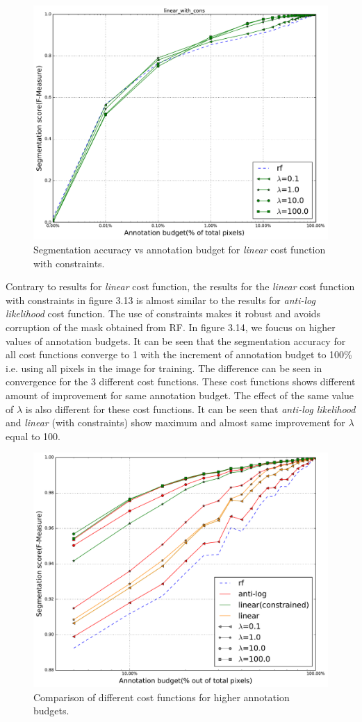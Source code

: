 \begin{figure}[h!] \label{fig:rf_vip3}
\centering
 \includegraphics[width=0.75\linewidth]{figures/linear_with_cons.pdf}
\caption{Segmentation accuracy vs annotation budget for \textit{linear} cost function with constraints.}
\end{figure}

Contrary to results for \textit{linear} cost function, the results for the \textit{linear} cost function with constraints in figure 3.13 is almost similar to the results for \textit{anti-log likelihood} cost function. The use of constraints makes it robust and avoids corruption of the mask obtained from RF. In figure 3.14, we foucus on higher values of annotation budgets. It can be seen that the segmentation accuracy for all cost functions converge to 1 with the increment of annotation budget to 100\% i.e. using all pixels in the image for training. The difference can be seen in convergence for the 3 different cost functions. These cost functions shows different amount of improvement for same annotation budget. The effect of the same value of $\lambda$ is also different for these cost functions. It can be seen that \textit{anti-log likelihood} and \textit{linear} (with constraints) show maximum and almost same improvement for $\lambda$ equal to 100.



\begin{figure}[h!] \label{fig:rf_vip_diff}
 \includegraphics[width=0.75\linewidth]{figures/vip_diff.pdf}
\caption{Comparison of different cost functions for higher annotation budgets.}
\end{figure}


